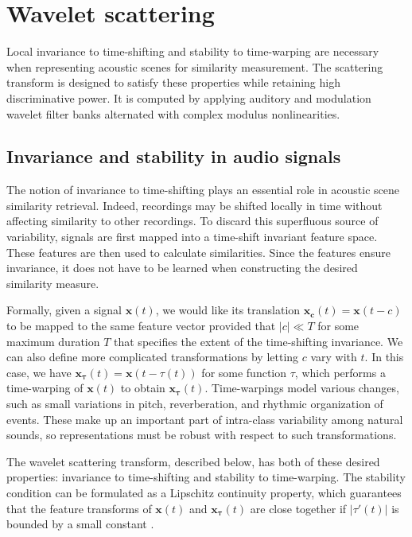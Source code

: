 \documentclass[smallextended]{svjour3}
\begin{document}
\section{Wavelet scattering \label{sec:scattering}}

Local invariance to time-shifting and stability to time-warping are necessary when representing acoustic scenes for similarity measurement.
The scattering transform is designed to satisfy these properties while retaining high discriminative power.
It is computed by applying auditory and modulation wavelet filter banks alternated with complex modulus nonlinearities.

\subsection{Invariance and stability in audio signals}
The notion of invariance to time-shifting plays an essential role in acoustic scene similarity retrieval.
Indeed, recordings may be shifted locally in time without affecting similarity to other recordings.
To discard this superfluous source of variability, signals are first mapped into a time-shift invariant feature space. These features are then used to calculate similarities. Since the features ensure invariance, it does not have to be learned when constructing the desired similarity measure.

Formally, given a signal $\boldsymbol{x}(t)$, we would like its translation $\boldsymbol{x_c}(t) = \boldsymbol{x}(t-c)$ to be mapped to the same feature vector provided that $|c| \ll T$ for some maximum duration $T$ that specifies the extent of the time-shifting invariance. We can also define more complicated transformations by letting $c$ vary with $t$. In this case, we have $\boldsymbol{x_\tau}(t) = \boldsymbol{x}(t-\tau(t))$ for some function $\tau$, which performs a time-warping of $\boldsymbol{x}(t)$ to obtain $\boldsymbol{x_\tau}(t)$. Time-warpings model various changes, such as small variations in pitch, reverberation, and rhythmic organization of events. These make up an important part of intra-class variability among natural sounds, so representations must be robust with respect to such transformations.

The wavelet scattering transform, described below, has both of these desired properties: invariance to time-shifting and stability to time-warping. The stability condition can be formulated as a Lipschitz continuity property, which guarantees that the feature transforms of $\boldsymbol{x}(t)$ and $\boldsymbol{x_\tau}(t)$ are close together if $|\tau'(t)|$ is bounded by a small constant \cite{Mallat2012}.
\end{document}
